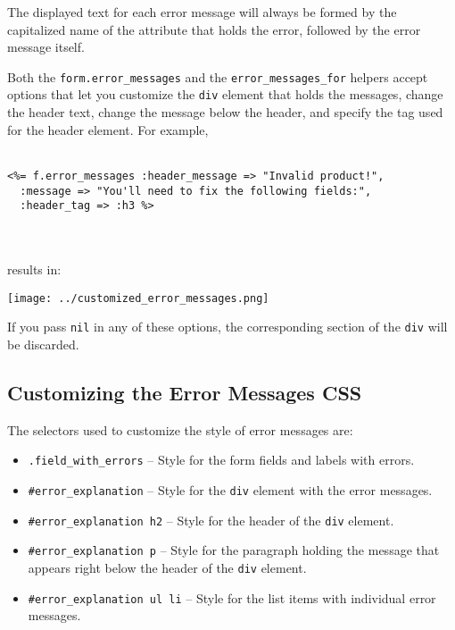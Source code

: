 \documentclass[10pt]{book}
\begin{document}
The displayed text for each error message will always be formed by  the capitalized name of the attribute that holds the error, followed by  the error message itself.

Both the \texttt{form.error\_messages} and the \texttt{error\_messages\_for} helpers accept options that let you customize the \texttt{div}  element that holds the messages, change the header text, change the  message below the header, and specify the tag used for the header  element. For example,
\\ \\
\begin{minipage}{\textwidth}{\scriptsize
\begin{verbatim}
<%= f.error_messages :header_message => "Invalid product!",
  :message => "You'll need to fix the following fields:",
  :header_tag => :h3 %>
\end{verbatim}}
\end{minipage}
\\ \\

results in:


\texttt{[image: ../customized\_error\_messages.png]}

If you pass \texttt{nil} in any of these options, the corresponding section of the \texttt{div} will be discarded.

\subsection{ Customizing the Error Messages CSS}

The selectors used to customize the style of error messages are:
\begin{itemize}
	\item \texttt{.field\_with\_errors} – Style for the form fields and labels with errors.
	\item \texttt{\#error\_explanation} – Style for the \texttt{div} element with the error messages.
	\item \texttt{\#error\_explanation h2} – Style for the header of the \texttt{div} element.
	\item \texttt{\#error\_explanation p} – Style for the paragraph holding the message that appears right below the header of the \texttt{div} element.
	\item \texttt{\#error\_explanation ul li} – Style for the list items with individual error messages.
\end{itemize}
\end{document}
